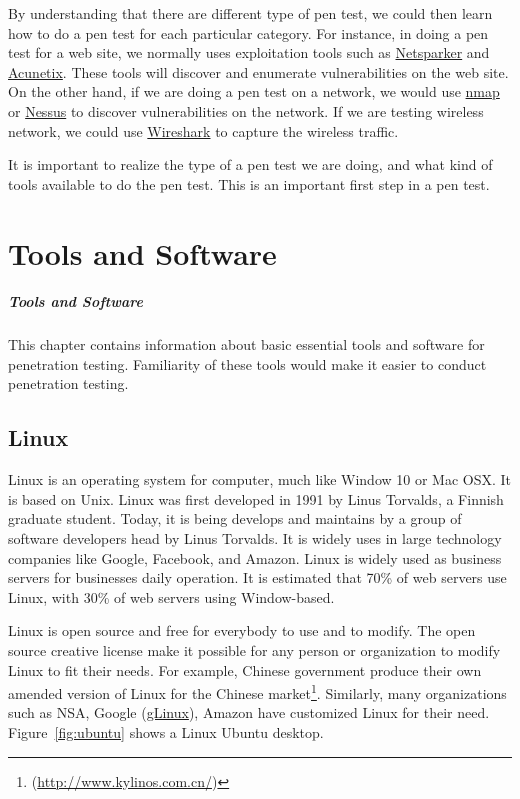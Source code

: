 \documentclass[7x9]{times}
\begin{document}
By understanding that there are different type of pen test,
we could then learn how to do a pen test for each particular
category. For instance, in doing a pen test for a web site,
we normally uses exploitation tools such as \url{Netsparker}
and \url{Acunetix}. These tools will discover and enumerate
vulnerabilities on the web site. On the other hand, if we
are doing a pen test on a network, we would use \url{nmap}
or \url{Nessus} to discover vulnerabilities on the network.
If we are testing wireless network, we could use
\url{Wireshark} to capture the wireless traffic.

It is important to realize the type of a pen test we are
doing, and what kind of tools available to do the pen test.
This is an important first step in a pen test.


\chapter{Tools and Software}


\paragraph{Tools and Software} This chapter contains
information about basic essential tools and software for
penetration testing. Familiarity of these tools would make
it easier to conduct penetration testing.


\section{Linux}

Linux\cite{sobell2015practical,barrett2016linux} is an
operating system for computer, much like Window 10 or Mac
OSX\@. It is based on Unix. Linux was first developed in 1991
by Linus Torvalds, a Finnish graduate student. Today, it is
being develops and maintains by a group of software
developers head by Linus Torvalds. It is widely uses in
large technology companies like Google, Facebook, and
Amazon. Linux is widely used as business servers for
businesses daily operation. It is estimated that 70\% of web
servers use Linux, with 30\% of web servers using
Window-based.

Linux is open source and free for everybody to use and to
modify. The open source creative license make it possible
for any person or organization to modify Linux to fit their
needs. For example, Chinese government produce their own
amended version of Linux for the Chinese
market\footnote{(\url{http://www.kylinos.com.cn/})}. Similarly, many
organizations such as NSA, Google (\url{gLinux}), Amazon have
customized Linux for their need. Figure~\ref{fig:ubuntu}
shows a Linux Ubuntu desktop.
\end{document}

